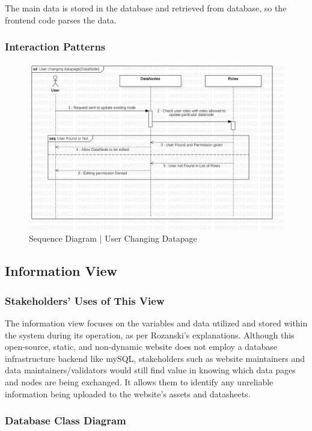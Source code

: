 The main data is stored in the database and retrieved from database, so the frontend code parses the data.

\subsubsection{Interaction Patterns}

\begin{figure}[H]
  \centering
  \includegraphics[width=\linewidth]{img/sequence-diagram-1-s5.jpg}
  \caption{Sequence Diagram | User Changing Datapage}
\end{figure}

\subsection{Information View}

\subsubsection{Stakeholders' Uses of This View}

The information view focuses on the variables and data utilized and stored within the system during its operation, as per Rozanski's explanations. Although this open-source, static, and non-dynamic website does not employ a database infrastructure backend like mySQL, stakeholders such as website maintainers and data maintainers/validators would still find value in knowing which data pages and nodes are being exchanged. It allows them to identify any unreliable information being uploaded to the website's assets and datasheets.

\subsubsection{Database Class Diagram}


